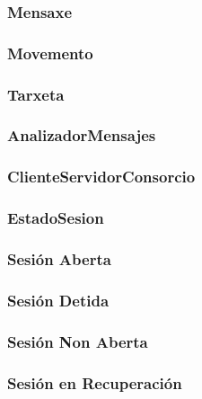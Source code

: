 \documentclass[a4paper,titlepage]{article}
\begin{document}
\subsubsection{Mensaxe}

\subsubsection{Movemento}

\subsubsection{Tarxeta}

\subsubsection{AnalizadorMensajes}

\subsubsection{ClienteServidorConsorcio}

\subsubsection{EstadoSesion}

\subsubsection{Sesión Aberta}

\subsubsection{Sesión Detida}

\subsubsection{Sesión Non Aberta}

\subsubsection{Sesión en Recuperación}

\end{document}
